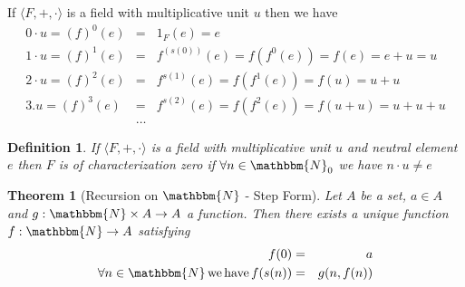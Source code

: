 \documentclass{book}
\newcommand{\tmop}[1]{\ensuremath{\operatorname{#1}}}
\newcommand{\upl}{+}
\newtheorem{definition}{Definition}
{\theorembodyfont{\rmfamily}\newtheorem{example}{Example}}
\newtheorem{theorem}{Theorem}
\begin{document}
{{\begin{example}
  If $\langle F, \upl, \cdot \rangle$ is a field with multiplicative unit $u$
  then we have
  \begin{eqnarray*}
    0 \cdot u = (f)^0 (e) & = & 1_F (e) = e\\
    1 \cdot u = (f)^1 (e) & = & f^{(s (0))} (e) = f (f^0 (e)) = f (e) = e + u
    = u\\
    2 \cdot u = (f)^2 (e) & = & f^{s (1)} (e) = f (f^1 (e)) = f (u) = u + u\\
    3. u = (f)^3 (e) & = & f^{s (2)} (e) = f (f^2 (e)) = f (u + u) = u + u +
    u\\
    & \ldots & 
  \end{eqnarray*}
\end{example}

\begin{definition}
  \label{field with characterization zero}{}If $\langle F, +, \cdot \rangle$ is a field with multiplicative unit
  $u$ and neutral element $e$ then $F$ is of characterization zero if $\forall
  n \in \mathbbm{N}_0$ we have $n \cdot u \neq e$
\end{definition}

\begin{theorem}[Recursion on $\mathbbm{N}$ - Step Form]
  \label{Recursion step form}{}Let
  $A$ be a set, $a \in A$ and $g : \mathbbm{N} \times A \rightarrow A$ a
  function. Then there exists a unique function $f : \mathbbm{N} \rightarrow
  A$ satisfying
  \begin{eqnarray*}
    f (0) & = & a\\
    \forall n \in \mathbbm{N} \tmop{we} \tmop{have} f (s (n)) & = & g (n, f
    (n))
  \end{eqnarray*}
\end{theorem}

}}
\end{document}
